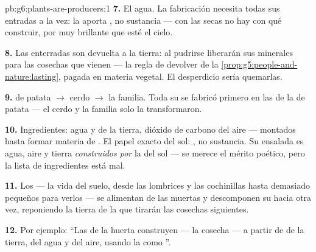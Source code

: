 \begin{solution}{pb:g6:plants-are-producers:1}
\textbf{7.} El agua. La fabricación necesita todas sus entradas a la
vez: la  aporta , no sustancia --- con las  secas no
hay con qué construir, por muy brillante que esté el cielo.

\textbf{8.} Las  enterradas son  devuelta a la
tierra: al pudrirse liberarán sus minerales para las cosechas que
vienen --- la regla de devolver de la
\cref{prop:g5:people-and-nature:lasting}, pagada en materia vegetal. El
desperdicio sería quemarlas.

\textbf{9.}  de patata $\rightarrow$ cerdo $\rightarrow$ la
familia. Toda su  se fabricó primero en las  de la
 de patata --- el cerdo y la familia solo la transformaron.

\textbf{10.} Ingredientes: agua y  de la tierra,
dióxido de carbono del aire --- montados hasta formar materia de .
El papel exacto del sol: , no sustancia. Su ensalada es agua,
aire y tierra \emph{construidos por} la  del sol --- se merece el
mérito poético, pero la lista de ingredientes está mal.

\textbf{11.} Los  --- la vida del suelo, desde las
lombrices y las cochinillas hasta  demasiado pequeños para
verlos --- se alimentan de las  muertas y descomponen su  hacia  otra vez, reponiendo la tierra de la que
tirarán las cosechas siguientes.

\textbf{12.} Por ejemplo: ``Las  de la huerta construyen
 --- la cosecha --- a partir de  de la
tierra, del agua y del aire, usando la  como ''.
\end{solution}
